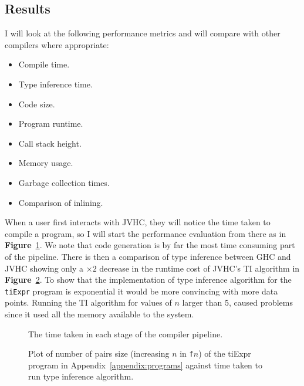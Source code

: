 \documentclass[float=false, crop=false]{standalone}
\newlength\gwidth
\newlength\gheight
\newcommand{\namefig}{\textbf{Figure}~}
\newcommand{\importMGraph}[3]{\setlength{\gwidth}{#2}\setlength{\gheight}{#3}{#1}}
\begin{document}
\subsection{Results}

I will look at the following performance metrics and will compare with other compilers where
appropriate:

\begin{itemize}
  \item Compile time.
  \item Type inference time.
  \item Code size.
  \item Program runtime.
  \item Call stack height.
  \item Memory usage.
  \item Garbage collection times.
  \item Comparison of inlining.
\end{itemize}

When a user first interacts with JVHC, they will notice the time taken to compile a program, so I will
start the performance evaluation from there as in \namefig\ref{plot:TimeInStages}. We note that code generation is by far the most time consuming part of the pipeline. There is then a comparison 
of type inference between GHC and JVHC showing only a $\times 2$ 
decrease in the runtime cost of JVHC's TI algorithm in 
\namefig\ref{plot:tiTime}. To show that the implementation of
type inference algorithm for the \verb|tiExpr| program is exponential
it would be more convincing with more data points.
Running the TI algorithm for values of $n$ larger than 5,
caused problems since it used all the memory available to the system.

\begin{samepage}
\begin{figure}[ht]
  \centering
      \importMGraph{plotStage.tex}{0.7\textwidth}{0.25\textwidth}
      \caption[Average time taken for an average program
      at each stage in the compiler]{The time taken in each stage of the compiler pipeline. }
      \label{plot:TimeInStages}
\end{figure}
  \end{samepage}

\begin{figure}
  \begin{samepage}
  \importMGraph{tiTime.tex}{0.93\textwidth}{0.4\textwidth}
  \caption[Type inference runtime as a function of input size]
  {Plot of number of pairs size (increasing $n$ in \texttt{f$n$}) 
    of the tiExpr program in Appendix~\ref{appendix:programs} against time taken 
    to run type inference algorithm.}
  \label{plot:tiTime}
\end{samepage}
\end{figure}
\end{document}
